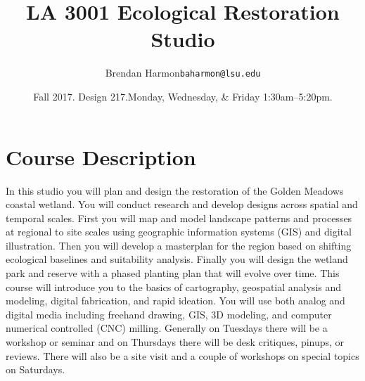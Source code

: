 \documentclass[11pt,article,oneside]{memoir}
\makeatletter
\def\myauthor{Author}
\def\mytitle{Title}
\def\myemail{baharmon@lsu.edu} %
\def\myauthor{Brendan Harmon}
\def\mytitle{{\normalsize \textsc{LA} 3001\newline} \huge \bfseries 
Ecological Restoration Studio}
\makeatother
\begin{document}
\setlength\bibitemsep{0.75em}

\setmainfont[Scale=1, Path = fonts/lato/,BoldItalicFont=Lato-RegIta,BoldFont=Lato-Reg,ItalicFont=Lato-LigIta]{Lato-Lig}
\setsansfont[Scale=1, Path = fonts/lato/,BoldItalicFont=Lato-RegIta,BoldFont=Lato-Reg,ItalicFont=Lato-LigIta]{Lato-Lig}
\setmonofont[Mapping=tex-text,Scale=0.8,Path = fonts/inconsolata/]{i}

\def\ind{\hangindent=1 true cm\hangafter=1 \noindent}
\def\labelitemi{$\cdot$}
\title{\LARGE \mytitle}     
\author{\Large\myauthor \newline \footnotesize\texttt{\noindent\myemail}}
\date{Fall 2017. Design 217.\newline Monday, Wednesday, \& Friday 1:30am--5:20pm.}
\published{\,}

\maketitle




\section{Course Description}

In this studio you will plan and design the restoration 
of the Golden Meadows coastal wetland. 
%
You will conduct research and develop designs 
across spatial and temporal scales.
%
First you will map and model landscape patterns and processes 
at regional to site scales using geographic information systems (GIS) 
and digital illustration. 
Then you will develop a masterplan for the region based on
shifting ecological baselines and suitability analysis.
Finally you will design the wetland park and reserve
with a phased planting plan that will evolve over time. 
%
This course will introduce you to the basics of cartography, 
geospatial analysis and modeling, digital fabrication,
and rapid ideation.
You will use both analog and digital media including
freehand drawing, GIS, 3D modeling, 
and computer numerical controlled (CNC) milling.
Generally on Tuesdays there will be a workshop or seminar
and on Thursdays there will be desk critiques, pinups, or reviews. 
There will also be a site visit 
and a couple of workshops on special topics on Saturdays.\\
\end{document}
